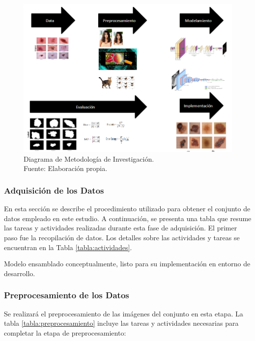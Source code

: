 \begin{figure}[h]
	\begin{center}
		\includegraphics[width=1\textwidth]{3/figures/metodologia.png}
		\caption[Diagrama de Metodología de Investigación]{Diagrama de Metodología de Investigación.\\
			Fuente: Elaboración propia.}
		\label{3:fig3}
	\end{center}
\end{figure}


\subsubsection{Adquisición de los Datos}

En esta sección se describe el procedimiento utilizado para obtener el conjunto de datos empleado en este estudio. A continuación, se presenta una tabla que resume las tareas y actividades realizadas durante esta fase de adquisición. El primer paso fue la recopilación de datos. Los detalles sobre las actividades y tareas se encuentran en la Tabla \ref{tabla:actividades}.

Modelo ensamblado conceptualmente, listo para su implementación en entorno de desarrollo.

\subsubsection{Preprocesamiento de los Datos}
Se realizará el preprocesamiento de las imágenes del conjunto en esta etapa. La tabla \ref{tabla:preprocesamiento} incluye las tareas y actividades necesarias para completar la etapa de preprocesamiento:
\vspace{2ex}


